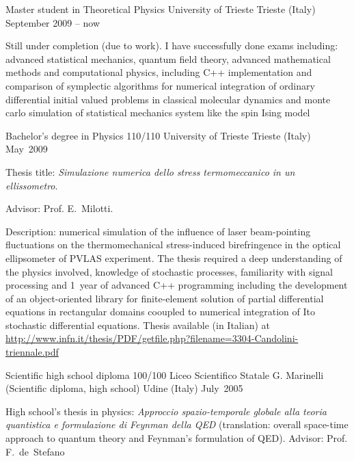 
\begin{cventries}
\cventry
{Master student in Theoretical Physics}
{University of Trieste}
{Trieste (Italy)}
{September 2009 -- now}%
{%
      \begin{cvitems}
      \item{%
   Still  under completion (due to work). I have successfully done  exams including: advanced statistical mechanics,
   quantum field theory, advanced mathematical methods and computational physics,
   including C++
   implementation and comparison of symplectic algorithms for numerical
   integration of ordinary differential initial valued problems in classical
   molecular dynamics and monte carlo simulation of statistical mechanics
   system like the spin Ising model
}
\end{cvitems}
}


\cventry
{Bachelor's degree in Physics 110/110}
{University of Trieste}
{Trieste (Italy)}
{May~2009}
{%
      \begin{cvitems}
      \item{%
   Thesis title: \emph{Simulazione numerica dello stress termomeccanico in un
      ellissometro}.
}
\item{%
   Advisor: Prof. E.~Milotti.
}
\item{%
   Description:
numerical simulation of the influence of laser beam-pointing fluctuations 
on the
   thermomechanical stress-induced birefringence in the optical
   ellipsometer of PVLAS experiment. The thesis required a deep understanding
   of the physics involved, knowledge of stochastic processes, familiarity with signal processing and 1~year of advanced C++ programming
   including the development of an object-oriented library for finite-element
   solution of partial differential equations 
   in rectangular domains cooupled to numerical integration of Ito stochastic differential
   equations.
Thesis available (in Italian) at 
\url{http://www.infn.it/thesis/PDF/getfile.php?filename=3304-Candolini-triennale.pdf}
}
\end{cvitems}
}
    

\cventry
{Scientific high school diploma 100/100} 
{Liceo Scientifico Statale G. Marinelli (Scientific diploma, high school)}
{Udine (Italy)}
{July~2005}
{%
      \begin{cvitems}
      \item{%
   High school's thesis in physics: \emph{Approccio spazio-temporale globale alla
      teoria quantistica e formulazione di Feynman della QED} (translation:
   overall space-time approach to quantum theory and Feynman's formulation of
   QED). Advisor: Prof.
   F.~de~Stefano
}
\end{cvitems}
}
 


\end{cventries}
